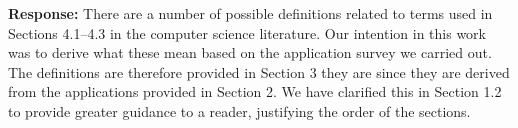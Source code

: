 \documentclass{article}
\begin{document}
\begin{enumerate}
  \textbf{Response:}
There are a number of possible definitions related to terms used in Sections 4.1--4.3 in the computer science literature. Our intention in this work was to derive what these mean based on the application survey we carried out. The definitions are therefore provided in Section 3 they are since they are derived from the applications provided in Section 2.  We have clarified this in Section 1.2 to provide greater guidance to a reader, justifying the order of the sections.



\end{enumerate}

\end{document}
